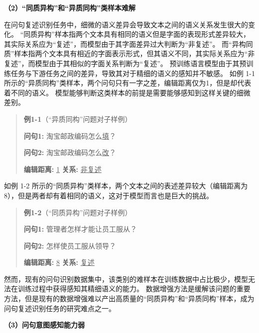 \textbf{\songti （2）“同质异构”和“异质同构”类样本难解}

在问句复述识别任务中，细微的语义差异会导致文本之间的语义关系发生很大的变化。
“同质异构”样本指两个文本具有相同的语义但是字面的表现形式差异较大，其实际关系应为“复述”，而模型由于其字面差异过大判断为“非复述”。
而“异构同质”样本指两个文本具有相近的字面表示形式，但其语义不同，其实际关系应为“非复述”，而模型由于其相似的字面关系判断为“复述”。
预训练语言模型由于其预训练任务与下游任务之间的差异，导致其对于精细的语义的感知并不敏感。
如例 1-1 所示的“异质同构”类样本，两个问句只有一字之差，编辑距离仅为1，但是却代表着不同的语义。
模型能够判断这类样本的前提是需要能够感知到这样关键的细微差别。
\begin{quotation}
    \noindent \textbf{\songti 例1-1}（“异质同构”问题对子样例）
    
    \noindent \textbf{问句1:} 淘宝邮政编码怎么\underline{填}？
    
    \noindent \textbf{问句2:} 淘宝邮政编码怎么\underline{改}？
    
    \noindent \textbf{编辑距离:} \underline{1} \qquad \textbf{关系:} \underline{非复述}
    
\end{quotation}

如例 1-2 所示的“同质异构”类样本，两个文本之间的表述差异较大（编辑距离为8），但是两者却有着相同的语义，这对于模型而言也是巨大的挑战。

\begin{quotation}
    \noindent \textbf{\songti 例1-2}（“同质异构”问题对子样例）
    
    \noindent \textbf{问句1:} 管理者怎样才能让员工服从？
    
    \noindent \textbf{问句2:} 怎样使员工服从领导？
    
    \noindent \textbf{编辑距离:}  \underline{8}  \qquad \textbf{关系:} \underline{复述}
    
\end{quotation}

然而，现有的问句识别数据集中，该类别的难样本在训练数据中占比极少，模型无法在训练过程中获得感知其精细语义的能力。
数据增强方法是缓解该问题的重要方法，但是现有的数据增强难以产出高质量的“同质异构”和“异质同构”样本，成为问句复述识别任务的研究难点之一。

\textbf{\songti （3）问句意图感知能力弱}


